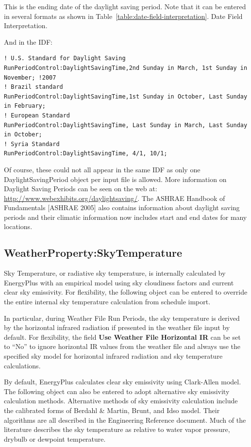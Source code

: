 This is the ending date of the daylight saving period. Note that it can be entered in several formats as shown in Table~\ref{table:date-field-interpretation}. Date Field Interpretation.

And in the IDF:

\begin{lstlisting}
! U.S. Standard for Daylight Saving
RunPeriodControl:DaylightSavingTime,2nd Sunday in March, 1st Sunday in November; !2007
! Brazil standard
RunPeriodControl:DaylightSavingTime,1st Sunday in October, Last Sunday in February;
! European Standard
RunPeriodControl:DaylightSavingTime, Last Sunday in March, Last Sunday in October;
! Syria Standard
RunPeriodControl:DaylightSavingTime, 4/1, 10/1;
\end{lstlisting}

Of course, these could not all appear in the same IDF as only one DaylightSavingPeriod object per input file is allowed. More information on Daylight Saving Periods can be seen on the web at: \url{http://www.webexhibits.org/daylightsaving/}. The ASHRAE Handbook of Fundamentals {[}ASHRAE 2005{]} also contains information about daylight saving periods and their climatic information now includes start and end dates for many locations.

\subsection{WeatherProperty:SkyTemperature}\label{weatherpropertyskytemperature}

Sky Temperature, or radiative sky temperature, is internally calculated by EnergyPlus with an empirical model using sky cloudiness factors and current clear sky emissivity. For flexibility, the following object can be entered to override the entire internal sky temperature calculation from schedule import.

In particular, during Weather File Run Periods, the sky temperature is derived by the horizontal infrared radiation if presented in the weather file input by default. For flexibility, the field \textbf{Use Weather File Horizontal IR} can be set to ``No'' to ignore horizontal IR values from the weather file and always use the specified sky model for horizontal infrared radiation and sky temperature calculations.

By default, EnergyPlus calculates clear sky emissivity using Clark-Allen model. The following object can also be entered to adopt alternative sky emissivity calculation methods. Alternative methods of sky emissivity calculation include the calibrated forms of Berdahl \& Martin, Brunt, and Idso model. Their algorithms are all described in the Engineering Reference document. Much of the literature describes the sky temperature as relative to water vapor pressure, drybulb or dewpoint temperature.

